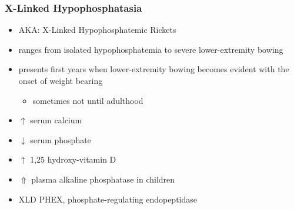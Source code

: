 \documentclass{scrartcl}
\begin{document}
\subsubsection{X-Linked Hypophosphatasia}
\label{sec:org3e20d1a}
\begin{itemize}
\item AKA: X-Linked Hypophosphatemic Rickets
\item ranges from isolated hypophosphatemia to severe lower-extremity bowing
\item presents first  years when lower-extremity bowing becomes
evident with the onset of weight bearing
\begin{itemize}
\item sometimes not until adulthood
\end{itemize}
\item \(\uparrow\) serum calcium
\item \(\downarrow\) serum phosphate
\item \(\uparrow\) 1,25 hydroxy-vitamin D
\item \(\Uparrow\) plasma alkaline phosphatase in children
\item XLD PHEX, phosphate-regulating endopeptidase
\end{itemize}
\end{document}
